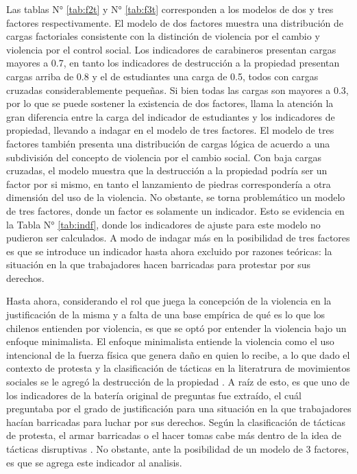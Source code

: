 \documentclass[12pt,twoside]{templates/facsothesis}
\begin{document}
Las tablas N° \ref{tab:f2t} y N° \ref{tab:f3t} corresponden a los modelos de dos y tres factores respectivamente. El modelo de dos factores muestra una distribución de cargas factoriales consistente con la distinción de violencia por el cambio y violencia por el control social. Los indicadores de carabineros presentan cargas mayores a 0.7, en tanto los indicadores de destrucción a la propiedad presentan cargas arriba de 0.8 y el de estudiantes una carga de 0.5, todos con cargas cruzadas considerablemente pequeñas. Si bien todas las cargas son mayores a 0.3, por lo que se puede sostener la existencia de dos factores, llama la atención la gran diferencia entre la carga del indicador de estudiantes y los indicadores de propiedad, llevando a indagar en el modelo de tres factores. El modelo de tres factores también presenta una distribución de cargas lógica de acuerdo a una subdivisión del concepto de violencia por el cambio social. Con baja cargas cruzadas, el modelo muestra que la destrucción a la propiedad podría ser un factor por si mismo, en tanto el lanzamiento de piedras correspondería a otra dimensión del uso de la violencia. No obstante, se torna problemático un modelo de tres factores, donde un factor es solamente un indicador. Esto se evidencia en la Tabla N° \ref{tab:indf}, donde los indicadores de ajuste para este modelo no pudieron ser calculados. A modo de indagar más en la posibilidad de tres factores es que se introduce un indicador hasta ahora excluido por razones teóricas: la situación en la que trabajadores hacen barricadas para protestar por sus derechos.

Hasta ahora, considerando el rol que juega la concepción de la violencia en la justificación de la misma \citep{Blumenthal1972} y a falta de una base empírica de qué es lo que los chilenos entienden por violencia, es que se optó por entender la violencia bajo un enfoque minimalista. El enfoque minimalista entiende la violencia como el uso intencional de la fuerza física que genera daño en quien lo recibe, a lo que dado el contexto de protesta y la clasificación de tácticas en la literatrura de movimientos sociales se le agregó la destrucción de la propiedad \citep{Medel2016}. A raíz de esto, es que uno de los indicadores de la batería original de preguntas fue extraído, el cuál preguntaba por el grado de justificación para una situación en la que trabajadores hacían barricadas para luchar por sus derechos. Según la clasificación de tácticas de protesta, el armar barricadas o el hacer tomas cabe más dentro de la idea de tácticas disruptivas \citep{Medel2016}. No obstante, ante la posibilidad de un modelo de 3 factores, es que se agrega este indicador al analisis.
\end{document}
